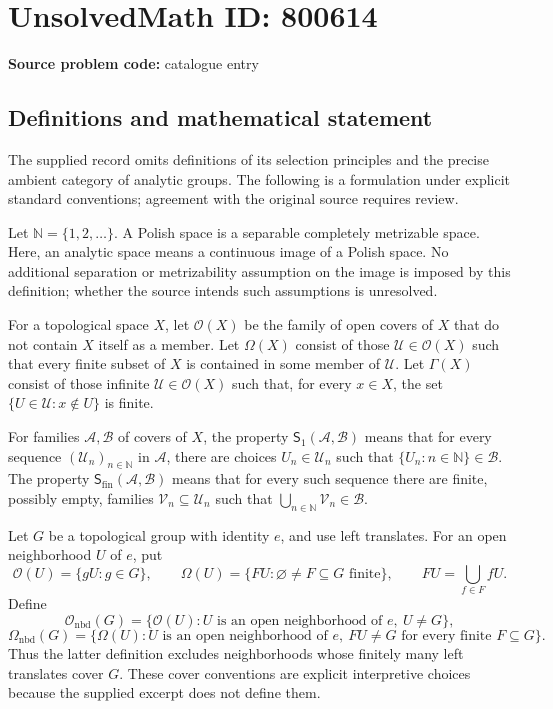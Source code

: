 \documentclass[11pt]{article}
\newcommand{\N}{\mathbb{N}}
\begin{document}
\section*{UnsolvedMath ID: 800614}
\textbf{Source problem code:} catalogue entry
\subsection{Definitions and mathematical statement}
The supplied record omits definitions of its selection principles and the precise ambient category of analytic groups. The following is a formulation under explicit standard conventions; agreement with the original source requires review.

Let \(\N=\{1,2,\ldots\}\). A Polish space is a separable completely metrizable space. Here, an analytic space means a continuous image of a Polish space. No additional separation or metrizability assumption on the image is imposed by this definition; whether the source intends such assumptions is unresolved.

For a topological space \(X\), let \(\mathcal O(X)\) be the family of open covers of \(X\) that do not contain \(X\) itself as a member. Let \(\Omega(X)\) consist of those \(\mathcal U\in\mathcal O(X)\) such that every finite subset of \(X\) is contained in some member of \(\mathcal U\). Let \(\Gamma(X)\) consist of those infinite \(\mathcal U\in\mathcal O(X)\) such that, for every \(x\in X\), the set \(\{U\in\mathcal U:x\notin U\}\) is finite.

For families \(\mathcal A,\mathcal B\) of covers of \(X\), the property \(\mathsf S_1(\mathcal A,\mathcal B)\) means that for every sequence \((\mathcal U_n)_{n\in\N}\) in \(\mathcal A\), there are choices \(U_n\in\mathcal U_n\) such that \(\{U_n:n\in\N\}\in\mathcal B\). The property \(\mathsf S_{\mathrm{fin}}(\mathcal A,\mathcal B)\) means that for every such sequence there are finite, possibly empty, families \(\mathcal V_n\subseteq\mathcal U_n\) such that \(\bigcup_{n\in\N}\mathcal V_n\in\mathcal B\).

Let \(G\) be a topological group with identity \(e\), and use left translates. For an open neighborhood \(U\) of \(e\), put
\[
\mathcal O(U)=\{gU:g\in G\},\qquad
\Omega(U)=\{FU:\varnothing\ne F\subseteq G\text{ finite}\},
\qquad FU=\bigcup_{f\in F}fU.
\]
Define
\[
\mathcal O_{\mathrm{nbd}}(G)
=\{\mathcal O(U):U\text{ is an open neighborhood of }e,\ U\ne G\},
\]
\[
\Omega_{\mathrm{nbd}}(G)
=\{\Omega(U):U\text{ is an open neighborhood of }e,
\ FU\ne G\text{ for every finite }F\subseteq G\}.
\]
Thus the latter definition excludes neighborhoods whose finitely many left translates cover \(G\). These cover conventions are explicit interpretive choices because the supplied excerpt does not define them.
\end{document}
